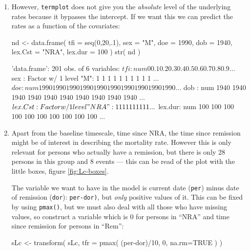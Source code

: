 \begin{enumerate}[resume]
  
\item However, \texttt{termplot} does not give you the \emph{absolute}
  level of the underlying rates because it bypasses the intercept. If
  we want this we can predict the rates as a function of the covariates:
\begin{Schunk}
\begin{Sinput}
 nd <- data.frame( tfi = seq(0,20,.1),
                   sex = "M",
                   doe = 1990,
                   dob = 1940,
               lex.Cst = "NRA",
               lex.dur = 100 )
 str( nd )
\end{Sinput}
\begin{Soutput}
'data.frame':	201 obs. of  6 variables:
 $ tfi    : num  0 0.1 0.2 0.3 0.4 0.5 0.6 0.7 0.8 0.9 ...
 $ sex    : Factor w/ 1 level "M": 1 1 1 1 1 1 1 1 1 1 ...
 $ doe    : num  1990 1990 1990 1990 1990 1990 1990 1990 1990 1990 ...
 $ dob    : num  1940 1940 1940 1940 1940 1940 1940 1940 1940 1940 ...
 $ lex.Cst: Factor w/ 1 level "NRA": 1 1 1 1 1 1 1 1 1 1 ...
 $ lex.dur: num  100 100 100 100 100 100 100 100 100 100 ...
\end{Soutput}
\end{Schunk}


\item Apart from the baseline timescale, time since NRA, the time
  since remission might be of interest in describing the mortality
  rate.  However this is only relevant for persons who actually have a
  remission, but there is only 28 persons in this group and 8 events
  --- this can be read of the plot with the little boxes, figure
  \ref{fig:Lc-boxes}.

  The variable we want to have in the model is current date
  (\texttt{per}) minus date of remission (\texttt{dor}):
  \texttt{per-dor)}, but \emph{only} positive values of it. This
  can be fixed by using \texttt{pmax()}, but we must also deal with
  all those who have missing values, so construct a variable which is
  0 for persons in ``NRA'' and time since remission for persons in ``Rem'':
\begin{Schunk}
\begin{Sinput}
 sLc <- transform( sLc, tfr = pmax( (per-dor)/10, 0, na.rm=TRUE ) )
\end{Sinput}
\end{Schunk}



\end{enumerate}
